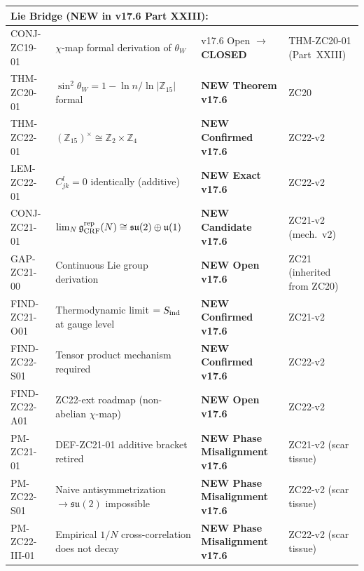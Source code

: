 \documentclass[12pt, a4paper]{article}
\begin{document}
\begin{keybox}[title={Master Z-Programme Status Table v17.6 (Canonical, Post-v17.6 Closures)}]
{\begin{longtable}{p{2.8cm} p{6.5cm} p{1.8cm} p{3.4cm}}
\midrule
\multicolumn{4}{l}{\textbf{Lie Bridge (NEW in v17.6 Part XXIII):}} \\
\midrule
CONJ-ZC19-01 & $\chi$-map formal derivation of $\theta_W$
   & v17.6 Open $\to$ \textbf{CLOSED} & THM-ZC20-01 (Part~XXIII) \\
THM-ZC20-01 & $\sin^2\theta_W = 1 - \ln n/\ln|\mathbb{Z}_{15}|$ formal
   & \textbf{NEW Theorem v17.6} & ZC20 \\
THM-ZC22-01 & $(\mathbb{Z}_{15})^\times \cong \mathbb{Z}_2 \times \mathbb{Z}_4$
   & \textbf{NEW Confirmed v17.6} & ZC22-v2 \\
LEM-ZC22-01 & $C_{jk}^l = 0$ identically (additive)
   & \textbf{NEW Exact v17.6} & ZC22-v2 \\
CONJ-ZC21-01 & $\lim_N \mathfrak{g}_{\rm CRF}^{\rm rep}(N)
  \cong \mathfrak{su}(2) \oplus \mathfrak{u}(1)$
   & \textbf{NEW Candidate v17.6} & ZC21-v2 (mech.\ v2) \\
GAP-ZC21-00 & Continuous Lie group derivation
   & \textbf{NEW Open v17.6} & ZC21 (inherited from ZC20) \\
FIND-ZC21-O01 & Thermodynamic limit $= S_{\rm ind}$ at gauge level
   & \textbf{NEW Confirmed v17.6} & ZC21-v2 \\
FIND-ZC22-S01 & Tensor product mechanism required
   & \textbf{NEW Confirmed v17.6} & ZC22-v2 \\
FIND-ZC22-A01 & ZC22-ext roadmap (non-abelian $\chi$-map)
   & \textbf{NEW Open v17.6} & ZC22-v2 \\
PM-ZC21-01 & DEF-ZC21-01 additive bracket retired
   & \textbf{NEW Phase Misalignment v17.6} & ZC21-v2 (scar tissue) \\
PM-ZC22-S01 & Naive antisymmetrization $\to \mathfrak{su}(2)$ impossible
   & \textbf{NEW Phase Misalignment v17.6} & ZC22-v2 (scar tissue) \\
PM-ZC22-III-01 & Empirical $1/N$ cross-correlation does not decay
   & \textbf{NEW Phase Misalignment v17.6} & ZC22-v2 (scar tissue) \\


\end{longtable}}
\end{keybox}
\end{document}
